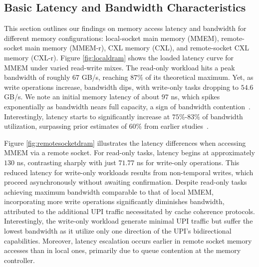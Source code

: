 \subsection{Basic Latency and Bandwidth Characteristics}
\label{ssec:performance}
This section outlines our findings on memory access latency and bandwidth for different memory configurations: local-socket main memory (MMEM), remote-socket main memory (MMEM-r), CXL memory (CXL), and remote-socket CXL memory (CXL-r). Figure \ref{fig:localdram} shows the loaded latency curve for MMEM under varied read-write mixes. The read-only workload hits a peak bandwidth of roughly $67$ GB/s, reaching $87\%$ of its theoretical maximum. Yet, as write operations increase, bandwidth dips, with write-only tasks dropping to $54.6$ GB/s. We note an initial memory latency of about $97$ ns, which spikes exponentially as bandwidth nears full capacity, a sign of bandwidth contention~\cite{cxl-centric, mt2}. Interestingly, latency starts to significantly increase at $75\%$-$83\%$ of bandwidth utilization, surpassing prior estimates of $60\%$ from earlier studies~\cite{cxl-centric}.


Figure \ref{fig:remotesocketdram} illustrates the latency differences when accessing MMEM via a remote socket. For read-only tasks, latency begins at approximately $130$ ns, contrasting sharply with just $71.77$ ns for write-only operations. This reduced latency for write-only workloads results from non-temporal writes, which proceed asynchronously without awaiting confirmation. Despite read-only tasks achieving maximum bandwidth comparable to that of local MMEM, incorporating more write operations significantly diminishes bandwidth, attributed to the additional UPI traffic necessitated by cache coherence protocols. Interestingly, the write-only workload generate minimal UPI traffic but suffer the lowest bandwidth as it utilize only one direction of the UPI's bidirectional capabilities. Moreover, latency escalation occurs earlier in remote socket memory accesses than in local ones, primarily due to queue contention at the memory controller.

